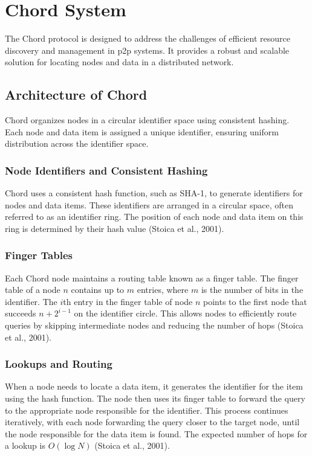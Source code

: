 \chapter{Chord System}
The Chord protocol is designed to address the challenges of efficient resource discovery and management in \gls{p2p} systems.
It provides a robust and scalable solution for locating nodes and data in a distributed network.

\section{Architecture of Chord}

Chord organizes nodes in a circular identifier space using consistent hashing.
Each node and data item is assigned a unique identifier, ensuring uniform distribution across the identifier space.

\subsection{Node Identifiers and Consistent Hashing}
Chord uses a consistent hash function, such as SHA-1, to generate identifiers for nodes and data items.
These identifiers are arranged in a circular space, often referred to as an identifier ring.
The position of each node and data item on this ring is determined by their hash value (Stoica et al., 2001).

\subsection{Finger Tables}
Each Chord node maintains a routing table known as a finger table.
The finger table of a node \(n\) contains up to \(m\) entries, where \(m\) is the number of bits in the identifier.
The \(i\)th entry in the finger table of node \(n\) points to the first node that succeeds \(n + 2^{i-1}\) on the identifier circle.
This allows nodes to efficiently route queries by skipping intermediate nodes and reducing the number of hops (Stoica et al., 2001).

\subsection{Lookups and Routing}
When a node needs to locate a data item, it generates the identifier for the item using the hash function.
The node then uses its finger table to forward the query to the appropriate node responsible for the identifier.
This process continues iteratively, with each node forwarding the query closer to the target node, until the node responsible for the data item is found.
The expected number of hops for a lookup is \(O(\log N)\) (Stoica et al., 2001).


